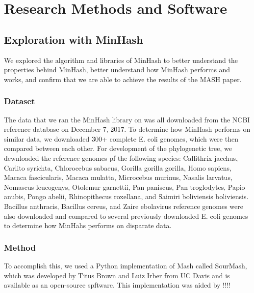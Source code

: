 \documentclass[12pt, letterpaper]{article}
\begin{document}
\section{Research Methods and Software}

\subsection{Exploration with MinHash}

We explored the algorithm and libraries of MinHash to better understand the properties behind MinHash, better understand how MinHash performs and works, and confirm that we are able to achieve the results of the MASH paper.

\subsubsection{Dataset}
The data that we ran the MinHash library on was all downloaded from the NCBI reference database on December 7, 2017. To determine how MinHash performs on similar data, we downloaded 300+ complete E. coli genomes, which were then compared between each other. For development of the phylogenetic tree, we dewnloaded the reference genomes pf the following species: Callithrix jacchus, Carlito syrichta, Chlorocebus sabaeus, Gorilla gorilla gorilla, Homo sapiens, Macaca fascicularis, Macaca mulatta, Microcebus murinus, Nasalis larvatus, Nomascus leucogenys, Otolemur garnettii, Pan paniscus, Pan troglodytes, Papio anubis, Pongo abelii, Rhinopithecus roxellana, and Saimiri boliviensis boliviensis. Bacillus anthracis, Bacillus cereus, and Zaire ebolavirus reference genomes were also downloaded and compared to several previously downloaded E. coli genomes to determine how MinHahs performs on disparate data.

\subsubsection{Method}
To accomplish this, we used a Python implementation of Mash called SourMash, which was developed by Titus Brown and Luiz Irber from UC Davis and is available as an open-source spftware.\cite{GitHub-Sourmash} This implementation was aided by !!!!
\end{document}
